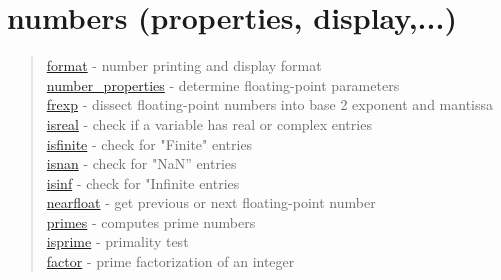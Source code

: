 \chapter*{numbers (properties, display,...)} 


\begin{quote}
\noindent
\hyperlink{format}{format} - number printing and display format\\
\hyperlink{number_properties}{number\_properties} - determine floating-point parameters \\
\hyperlink{frexp}{frexp} - dissect floating-point numbers into base 2 exponent and mantissa\\
\hyperlink{isreal}{isreal} - check if a variable has real or complex entries\\
\hyperlink{isfinite}{isfinite} - check for "Finite" entries \\
\hyperlink{isnan}{isnan} - check for "NaN'' entries \\
\hyperlink{isnan}{isinf} - check for "Infinite entries \\
\hyperlink{nearfloat}{nearfloat} - get previous or next floating-point number\\
\hyperlink{primes}{primes} - computes prime numbers\\
\hyperlink{isprime}{isprime} - primality test\\
\hyperlink{factor}{factor} - prime factorization of an integer\\
\end{quote}





 
 
 
 
 
 

